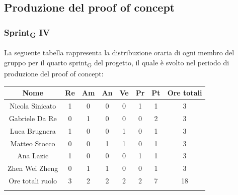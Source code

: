 %
\newpage
\subsection{Produzione del proof of concept}

\subsubsection{Sprint\textsubscript{G} IV}
%
La seguente tabella rappresenta la distribuzione oraria di ogni membro del gruppo per il quarto sprint\textsubscript{G} del progetto, il quale è svolto nel periodo di produzione del proof of concept:

	\setlength\extrarowheight{5pt}
	\begin{tabularx}{\textwidth}{|ccccccc|c|}
		\hline
		\rowcolor{white}
		\textbf{Nome} & \textbf{Re} & \textbf{Am} & \textbf{An} & \textbf{Ve} & \textbf{Pr}& \textbf{Pt} & \textbf{Ore totali} \\
		\hline
		Nicola Sinicato &1&0&0&0&1&1&3 \\
		Gabriele Da Re &0&1&0&0&0&2&3 \\
		Luca Brugnera &1&0&0&1&0&1&3 \\
		Matteo Stocco &0&0&1&1&0&1&3 \\
		Ana Lazic &1&0&0&0&1&1&3 \\
		Zhen Wei Zheng &0&1&1&0&0&1&3 \\
		\hline
		Ore totali ruolo &3&2&2&2&2&7&18 \\
		\hline
		\rowcolor{white}
		\caption{Distribuzione oraria durante il quarto sprint\textsubscript{G} per ruolo e persona}
	\end{tabularx}
	\vspace{10pt}
	
